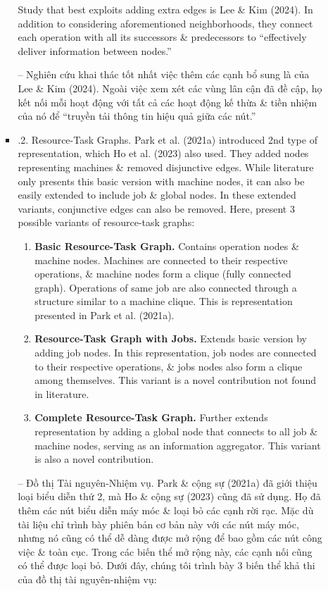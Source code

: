 \documentclass{article}
\begin{document}
\begin{itemize}
\begin{itemize}
\begin{itemize}
            Study that best exploits adding extra edges is Lee \& Kim (2024). In addition to considering aforementioned neighborhoods, they connect each operation with all its successors \& predecessors to ``effectively deliver information between nodes.''

            -- Nghiên cứu khai thác tốt nhất việc thêm các cạnh bổ sung là của Lee \& Kim (2024). Ngoài việc xem xét các vùng lân cận đã đề cập, họ kết nối mỗi hoạt động với tất cả các hoạt động kế thừa \& tiền nhiệm của nó để ``truyền tải thông tin hiệu quả giữa các nút.''
            \item {.2. Resource-Task Graphs.} Park et al. (2021a) introduced 2nd type of representation, which Ho et al. (2023) also used. They added nodes representing machines \& removed disjunctive edges. While literature only presents this basic version with machine nodes, it can also be easily extended to include job \& global nodes. In these extended variants, conjunctive edges can also be removed. Here, present 3 possible variants of resource-task graphs:
            \begin{enumerate}
                \item {\bf Basic Resource-Task Graph.} Contains operation nodes \& machine nodes. Machines are connected to their respective operations, \& machine nodes form a clique (fully connected graph). Operations of same job are also connected through a structure similar to a machine clique. This is representation presented in Park et al. (2021a).
                \item {\bf Resource-Task Graph with Jobs.} Extends basic version by adding job nodes. In this representation, job nodes are connected to their respective operations, \& jobs nodes also form a clique among themselves. This variant is a novel contribution not found in literature.
                \item {\bf Complete Resource-Task Graph.} Further extends representation by adding a global node that connects to all job \& machine nodes, serving as an information aggregator. This variant is also a novel contribution.
            \end{enumerate}
            -- {\sf Đồ thị Tài nguyên-Nhiệm vụ.} Park \& cộng sự (2021a) đã giới thiệu loại biểu diễn thứ 2, mà Ho \& cộng sự (2023) cũng đã sử dụng. Họ đã thêm các nút biểu diễn máy móc \& loại bỏ các cạnh rời rạc. Mặc dù tài liệu chỉ trình bày phiên bản cơ bản này với các nút máy móc, nhưng nó cũng có thể dễ dàng được mở rộng để bao gồm các nút công việc \& toàn cục. Trong các biến thể mở rộng này, các cạnh nối cũng có thể được loại bỏ. Dưới đây, chúng tôi trình bày 3 biến thể khả thi của đồ thị tài nguyên-nhiệm vụ:

\end{itemize}
\end{itemize}
\end{itemize}
\end{document}
